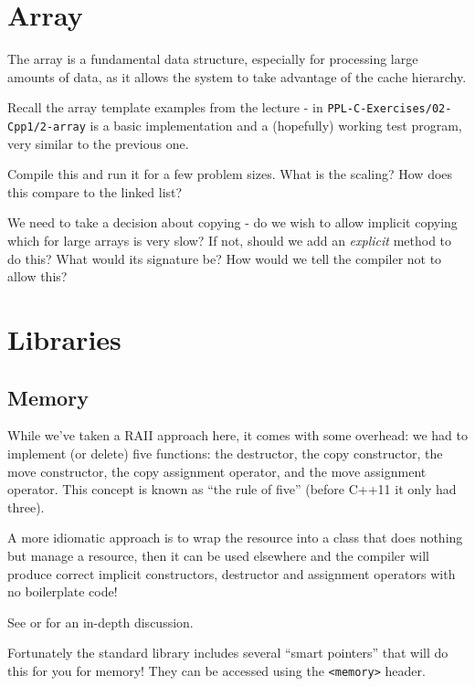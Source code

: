 \documentclass{article}
\newcommand{\code}[1]{\lstinline!#1!}
\newcommand{\fn}[1]{\texttt{#1}}
\begin{document}
\section{Array}
The array is a fundamental data structure, especially for processing
large amounts of data, as it allows the system to take advantage of
the cache hierarchy. 

Recall the array template examples from the lecture - in
\fn{PPL-C-Exercises/02-Cpp1/2-array} is a basic implementation and a
(hopefully) working test program, very similar to the previous one.

Compile this and run it for a few problem sizes. What is the scaling?
How does this compare to the linked list?

We need to take a decision about copying - do we wish to allow
implicit copying which for large arrays is very slow? If not, should
we add an \emph{explicit} method to do this? What would its signature
be? How would we tell the compiler not to allow this?

\section{Libraries}
\subsection{Memory}
While we've taken a RAII approach here, it comes with some overhead:
we had to implement (or delete) five functions: the destructor, the
copy constructor, the move constructor, the copy assignment operator,
and the move assignment operator. This concept is known as ``the rule
of five'' (before C++11 it only had three).

A more idiomatic approach is to wrap the resource into a class that
does nothing but manage a resource, then it can be used elsewhere and
the compiler will produce correct implicit constructors, destructor
and assignment operators with no boilerplate code!

See \cite{rule3} or \cite{meyers-rule0} for an in-depth discussion.

Fortunately the standard library includes several ``smart pointers''
that will do this for you for memory! They can be accessed using the
\code{<memory>} header.
\end{document}
